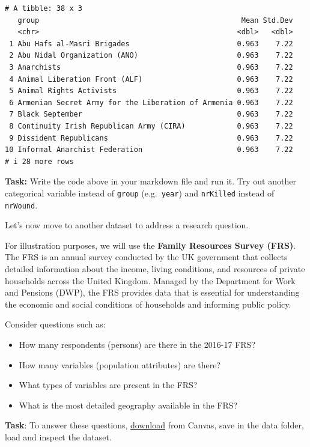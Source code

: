 \documentclass[
  letterpaper,
  DIV=11,
  numbers=noendperiod]{scrreprt}
\providecommand{\tightlist}{%
  \setlength{\itemsep}{0pt}\setlength{\parskip}{0pt}}\usepackage{longtable,booktabs,array}
\begin{document}
\begin{verbatim}
# A tibble: 38 x 3
   group                                               Mean Std.Dev
   <chr>                                              <dbl>   <dbl>
 1 Abu Hafs al-Masri Brigades                         0.963    7.22
 2 Abu Nidal Organization (ANO)                       0.963    7.22
 3 Anarchists                                         0.963    7.22
 4 Animal Liberation Front (ALF)                      0.963    7.22
 5 Animal Rights Activists                            0.963    7.22
 6 Armenian Secret Army for the Liberation of Armenia 0.963    7.22
 7 Black September                                    0.963    7.22
 8 Continuity Irish Republican Army (CIRA)            0.963    7.22
 9 Dissident Republicans                              0.963    7.22
10 Informal Anarchist Federation                      0.963    7.22
# i 28 more rows
\end{verbatim}

\textbf{Task:} Write the code above in your markdown file and run it.
Try out another categorical variable instead of \texttt{group}
(e.g.~\texttt{year}) and \texttt{nrKilled} instead of \texttt{nrWound}.

Let's now move to another dataset to address a research question.

For illustration purposes, we will use the \textbf{Family Resources
Survey (FRS)}. The FRS is an annual survey conducted by the UK
government that collects detailed information about the income, living
conditions, and resources of private households across the United
Kingdom. Managed by the Department for Work and Pensions (DWP), the FRS
provides data that is essential for understanding the economic and
social conditions of households and informing public policy.

Consider questions such as:

\begin{itemize}
\tightlist
\item
  How many respondents (persons) are there in the 2016-17 FRS?
\item
  How many variables (population attributes) are there?
\item
  What types of variables are present in the FRS?
\item
  What is the most detailed geography available in the FRS?
\end{itemize}

\textbf{Task}: To answer these questions,
\href{https://canvas.liverpool.ac.uk/courses/84668/files/12887864?wrap=1}{download}
from Canvas, save in the data folder, load and inspect the dataset.
\end{document}
